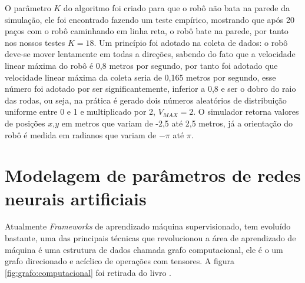 O parâmetro $K$ do algoritmo foi criado para que o robô não bata na parede
da simulação, ele foi encontrado fazendo um teste empírico, mostrando que
após 20 paços  com o robô caminhando em linha reta, o robô bate na parede,
por tanto nos nossos testes $K = 18$. Um princípio foi adotado na coleta
de dados: o robô deve-se mover lentamente em todas a direções, sabendo do
fato que a velocidade linear máxima do robô é 0,8 metros por segundo,
por tanto foi adotado que velocidade linear máxima da coleta seria de 
0,165 metros por segundo, esse número foi adotado por ser significantemente,
inferior a 0,8  e ser o dobro do raio das rodas, ou seja, na prática é gerado
dois números aleatórios de distribuição uniforme entre 0 e 1 e multiplicado por
2, $V_{MAX} = 2$. O simulador retorna valores de posições $x$,$y$ em metros
que variam de -2,5 até 2,5 metros, já a orientação do robô é medida em radianos
que variam de $-\pi$ até $\pi$.

\section{Modelagem de parâmetros de redes neurais artificiais}
Atualmente \textit{Frameworks} de aprendizado máquina supervisionado,
tem evoluído bastante, uma das principais técnicas que revolucionou a
área de aprendizado de máquina é uma estrutura de dados chamada grafo
computacional, ele é o um grafo direcionado e acíclico de operações com
tensores. A figura \ref{fig:grafo:computacional} foi retirada do livro
\cite{chollet2021deep}.

